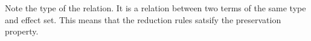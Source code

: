 \documentclass[a4paper,11pt]{article}
\newcommand\data[1]{{\AgdaFunction{#1}}}
\begin{document}
\begin{AgdaAlign}
\begin{code}
%
\\[\AgdaEmptyExtraSkip]%
%
\>[4]\AgdaSpace{}%
\AgdaSymbol{:}\AgdaSpace{}%
\AgdaSymbol{\{}\AgdaSpace{}%
\AgdaSpace{}%
\AgdaSymbol{:}\AgdaSpace{}%
\AgdaSpace{}%
\AgdaSpace{}%
\AgdaSpace{}%
\AgdaSymbol{\}}\<%
\\
\>[4][@{}l@{\AgdaIndent{0}}]%
\>[6]\AgdaSpace{}%
\AgdaSpace{}%
\AgdaSpace{}%
\<%
\\
%
\>[6]\AgdaSpace{}%
\AgdaSpace{}%
\AgdaSpace{}%
\AgdaSpace{}%
\AgdaSpace{}%
\<%
\\
%
\\[\AgdaEmptyExtraSkip]%
%
\>[4]\AgdaSpace{}%
\AgdaSymbol{:}\AgdaSpace{}%
\AgdaSpace{}%
\AgdaSymbol{\{}\AgdaSpace{}%
\AgdaSymbol{\}}\<%
\\
\>[4][@{}l@{\AgdaIndent{0}}]%
\>[6]\AgdaSpace{}%
\AgdaSpace{}%
\AgdaSpace{}%
\<%
\\
%
\>[6]\AgdaSpace{}%
\AgdaSpace{}%
\AgdaSymbol{\{}\AgdaSpace{}%
\AgdaSymbol{:}\AgdaSpace{}%
\AgdaSpace{}%
\AgdaSpace{}%
\AgdaSpace{}%
\AgdaSymbol{\}}\AgdaSpace{}%
\AgdaSymbol{\{}\AgdaSymbol{\}}\AgdaSpace{}%
\AgdaSpace{}%
\AgdaSpace{}%
\AgdaSpace{}%
\AgdaSpace{}%
\AgdaSpace{}%
\AgdaSpace{}%
\AgdaSpace{}%
\AgdaSpace{}%
\AgdaSpace{}%
\<%
\end{code}
\end{AgdaAlign}
Note the type of the \data{\_⟶\_} relation. It is a relation between two terms of the same type and effect set.
This means that the reduction rules satsify the preservation property.
\end{document}
